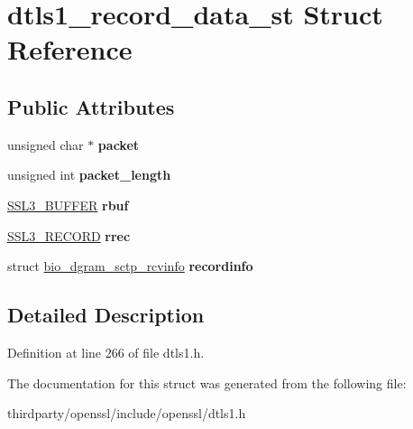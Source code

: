 \hypertarget{structdtls1__record__data__st}{}\section{dtls1\+\_\+record\+\_\+data\+\_\+st Struct Reference}
\label{structdtls1__record__data__st}
\subsection*{Public Attributes}
\begin{DoxyCompactItemize}
\item 
\mbox{\label{structdtls1__record__data__st_af010cf2b401153c4312245f1d62edc95}} 
unsigned char $\ast$ {\bfseries packet}
\item 
\mbox{\label{structdtls1__record__data__st_a37b63c2a75775b814e855a5fc59dca26}} 
unsigned int {\bfseries packet\+\_\+length}
\item 
\mbox{\label{structdtls1__record__data__st_ae1bd1518437b259efb71f1a80b612213}} 
\hyperlink{structssl3__buffer__st}{S\+S\+L3\+\_\+\+B\+U\+F\+F\+ER} {\bfseries rbuf}
\item 
\mbox{\label{structdtls1__record__data__st_a4b62074b684a63163d87bfbf27bc8453}} 
\hyperlink{structssl3__record__st}{S\+S\+L3\+\_\+\+R\+E\+C\+O\+RD} {\bfseries rrec}
\item 
\mbox{\label{structdtls1__record__data__st_a0b4f7a6a839c605efd493b4c6c0a437b}} 
struct \hyperlink{structbio__dgram__sctp__rcvinfo}{bio\+\_\+dgram\+\_\+sctp\+\_\+rcvinfo} {\bfseries recordinfo}
\end{DoxyCompactItemize}


\subsection{Detailed Description}


Definition at line 266 of file dtls1.\+h.



The documentation for this struct was generated from the following file\+:\begin{DoxyCompactItemize}
\item 
thirdparty/openssl/include/openssl/dtls1.\+h\end{DoxyCompactItemize}
